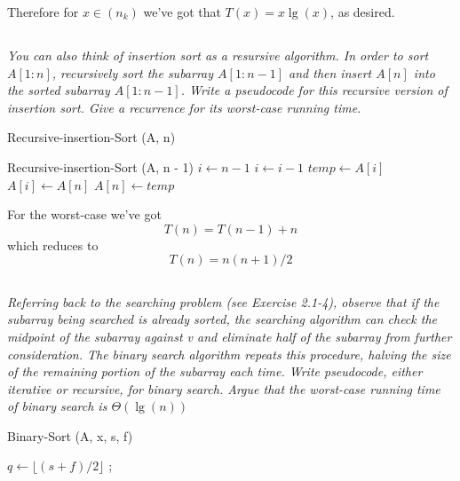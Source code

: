 \documentclass[11pt,oneside,titlepage]{book}
\begin{document}
Therefore for $x \in (n_k)$ we've got that $T(x) = x \lg(x)$, as desired.

\subsection{}

\textit{You can also think of insertion sort as a resursive algorithm. In order to sort
  $A[1:n]$, recursively sort the subarray $A[1:n - 1]$ and then insert $A[n]$ into the
  sorted subarray $A[1: n - 1]$. Write a pseudocode for this recursive version of insertion
  sort. Give a recurrence for its worst-case running time.}

\begin{function}
  \caption{Recursive-insertion-Sort (A, n)}
  Recursive-insertion-Sort (A, n - 1)\;
  $i \leftarrow n - 1$ \;
  {
    $i \leftarrow i - 1$
  }
  $temp \leftarrow A[i]$ \;
  $A[i] \leftarrow A[n]$ \;
  $A[n] \leftarrow temp$ \;
\end{function}

For the worst-case we've got
$$T(n) = T(n - 1) + n$$
which reduces to
$$T(n) = n(n + 1)/2$$


\subsection{}

\textit{Referring back to the searching problem (see Exercise 2.1-4), observe that if the
  subarray being searched is already sorted, the searching algorithm can check the
  midpoint of the subarray against v and eliminate half of the subarray from further
  consideration. The binary search algorithm repeats this procedure, halving the
  size of the remaining portion of the subarray each time. Write pseudocode, either
  iterative or recursive, for binary search. Argue that the worst-case running time of
  binary search is $\Theta(\lg(n))$}

\begin{function}
  \caption{Binary-Sort (A, x, s, f)}
   {
    \;
  }
  $q \leftarrow \lfloor (s + f)/2\rfloor$\;
   {
    ;
  }{
    {
       \;
    }
    {
       \;
    }
  }
\end{function}
\end{document}
